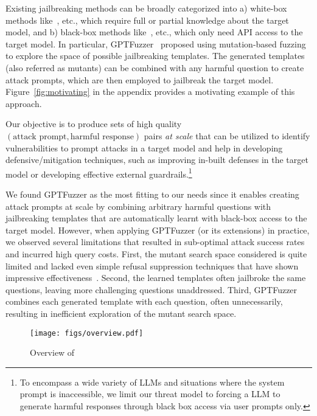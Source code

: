 Existing jailbreaking methods can be broadly categorized into a) white-box methods like~\cite{zou2023universal, wang2024a, liao2024amplegcg, paulus2024advprompter,andriushchenko2024jailbreaking, zhou2024don}, etc., which require full or partial knowledge about the target model, and b) black-box methods like~\cite{mehrotra2023tree, chao2023jailbreaking,takemoto2024all,sitawarin2024pal,liu2023autodan, yu2023gptfuzzer, samvelyan2024rainbow, zeng2024johnny, gong2024effective, yao2024fuzzllm}, etc., which only need API access to the target model.
In particular, GPTFuzzer~\cite{yu2023gptfuzzer} proposed using mutation-based fuzzing to explore the space of possible jailbreaking templates. The generated templates (also referred as mutants) can be combined with any harmful question to create attack prompts, which are then employed to jailbreak the target model. Figure~\ref{fig:motivating} in the appendix provides a motivating example of this approach.

Our objective is to produce sets of high quality $( \text{attack prompt}, \text{harmful response} )$ pairs \textit{at scale} that can be utilized to identify vulnerabilities to prompt attacks in a target model and help in developing defensive/mitigation techniques, such as improving in-built defenses in the target model or developing effective external guardrails.\footnote{To encompass a wide variety of LLMs and situations where the system prompt is inaccessible, we limit our threat model to forcing a LLM to generate harmful responses through black box access via user prompts only.}


We found GPTFuzzer as the most fitting to our needs since it enables creating attack prompts at scale by combining arbitrary harmful questions with jailbreaking templates that are automatically learnt with black-box access to the target model. However, when applying GPTFuzzer (or its extensions) in practice, we observed several limitations that resulted in sub-optimal attack success rates and incurred high query costs.
First, the mutant search space considered is quite limited and lacked even simple refusal suppression techniques that have shown impressive effectiveness~\cite{wei2024jailbroken}.
Second, the learned templates often jailbroke the same questions, leaving more challenging questions unaddressed.
Third,  GPTFuzzer combines each generated template with each question, often unnecessarily, resulting in inefficient exploration of the mutant search space.
\begin{figure*}[t]
\centerline{\texttt{[image: figs/overview.pdf]}}
\caption{Overview of \bedrockfuzz}
\label{fig:workflow}
\end{figure*}

